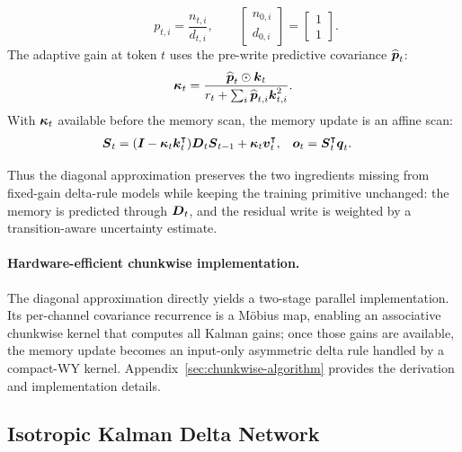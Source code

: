 \documentclass[11pt,letterpaper,logo]{yalearxiv}
\begin{document}
\begin{tcolorbox}
\begin{equation}
  \qquad
  p_{t,i}=\frac{n_{t,i}}{d_{t,i}},
  \qquad
  \begin{bmatrix}n_{0,i}\\ d_{0,i}\end{bmatrix}
  =
  \begin{bmatrix}1\\ 1\end{bmatrix}.
  \label{eq:kla-box-mobius}
\end{equation}
The adaptive gain at token $t$ uses the pre-write predictive covariance $\widehat{\boldsymbol{p}}_t$:
\begin{equation}
  \boldsymbol{\kappa}_t
  =
  \frac{\widehat{\boldsymbol{p}}_t\odot\boldsymbol{k}_t}
  {r_t+\sum_i \widehat{\boldsymbol{p}}_{t,i}\boldsymbol{k}_{t,i}^2}.
\label{eq:kla-box-gain}
\end{equation}
With $\boldsymbol{\kappa}_t$ available before the memory scan, the memory update is an affine scan:
\begin{equation}
\begin{aligned}
  \boldsymbol{S}_t
  &=
  (\boldsymbol{I}-\boldsymbol{\kappa}_t\boldsymbol{k}_t^{\intercal})\boldsymbol{D}_t\boldsymbol{S}_{t-1}
  +\boldsymbol{\kappa}_t\boldsymbol{v}_t^{\intercal},
  &
  \boldsymbol{o}_t &= \boldsymbol{S}_t^{\intercal}\boldsymbol{q}_t .
\end{aligned}
\label{eq:kla-box-memory}
\end{equation}
\end{tcolorbox}

Thus the diagonal approximation preserves the two ingredients missing from fixed-gain
delta-rule models while keeping the training primitive unchanged: the memory is predicted
through $\boldsymbol{D}_t$, and the residual write is weighted by a transition-aware uncertainty
estimate.

\paragraph{Hardware-efficient chunkwise implementation.}
The diagonal approximation directly yields a two-stage parallel implementation. Its per-channel
covariance recurrence is a M\"obius map, enabling an associative chunkwise kernel that computes
all Kalman gains; once those gains are available, the memory update becomes an input-only
asymmetric delta rule handled by a compact-WY kernel. Appendix~\ref{sec:chunkwise-algorithm}
provides the derivation and implementation details.

\subsection{Isotropic Kalman Delta Network}
\label{sec:isotropic-kdn}
\end{document}
